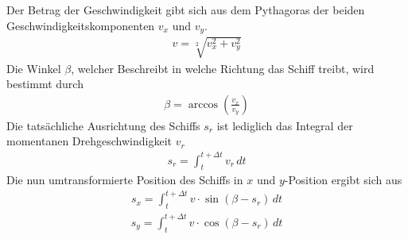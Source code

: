 \documentclass[]{iat}
\begin{document}
Der Betrag der Geschwindigkeit gibt sich aus dem Pythagoras der beiden Geschwindigkeitskomponenten $v_x$ und $v_y$.
\begin{align}
    v = \sqrt[2]{v_x^2 + v_y^2}
\end{align}
Die Winkel $\beta$, welcher Beschreibt in welche Richtung das Schiff treibt, wird bestimmt durch
\begin{align}
    \beta = \arccos \left( \frac{v_x}{v_y} \right)
\end{align}
Die tatsächliche Ausrichtung des Schiffs $s_r$ ist lediglich das Integral der momentanen Drehgeschwindigkeit $v_r$
\begin{align}
    s_r = \int_{t}^{t+\Delta t} v_r \, dt
\end{align}
Die nun umtransformierte Position des Schiffs in $x$ und $y$-Position ergibt sich aus
\begin{align}
    s_x = \int_{t}^{t+\Delta t} v \cdot \sin(\beta - s_r) \, dt
\end{align}
\begin{align}
    s_y = \int_{t}^{t+\Delta t} v \cdot \cos(\beta - s_r) \, dt
\end{align}
\end{document}
